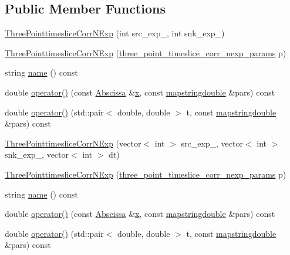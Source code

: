 \subsection*{Public Member Functions}
\begin{DoxyCompactItemize}
\item 
\mbox{\hyperlink{classThreePointtimesliceCorrNExp_ac8a35f83e9a0291cd475b9a5ae5e1845}{Three\+Pointtimeslice\+Corr\+N\+Exp}} (int src\+\_\+exp\+\_\+, int snk\+\_\+exp\+\_\+)
\item 
\mbox{\hyperlink{classThreePointtimesliceCorrNExp_ac534e7a713a02952ba092e95e77b9838}{Three\+Pointtimeslice\+Corr\+N\+Exp}} (\mbox{\hyperlink{structthree__point__timeslice__corr__nexp__params}{three\+\_\+point\+\_\+timeslice\+\_\+corr\+\_\+nexp\+\_\+params}} p)
\item 
string \mbox{\hyperlink{classThreePointtimesliceCorrNExp_aa137e909c6466275f495aac9f2d24178}{name}} () const
\item 
double \mbox{\hyperlink{classThreePointtimesliceCorrNExp_a4d3143ae44c362e4dae6221ace8f1c02}{operator()}} (const \mbox{\hyperlink{classAbscissa}{Abscissa}} \&\mbox{\hyperlink{old__edb_8cc_a63584b830e7aaacb521b11b72291a4bc}{x}}, const \mbox{\hyperlink{lib_2fitting__lib_2includes_8h_a647b481c557c7966517f753340a81d13}{mapstringdouble}} \&pars) const
\item 
double \mbox{\hyperlink{classThreePointtimesliceCorrNExp_a32c3a96362aae58e8eb5a5eb8f5aafc9}{operator()}} (std\+::pair$<$ double, double $>$ t, const \mbox{\hyperlink{lib_2fitting__lib_2includes_8h_a647b481c557c7966517f753340a81d13}{mapstringdouble}} \&pars) const
\item 
\mbox{\hyperlink{classThreePointtimesliceCorrNExp_a12f727578fcbdda46fd6e959853d5392}{Three\+Pointtimeslice\+Corr\+N\+Exp}} (vector$<$ int $>$ src\+\_\+exp\+\_\+, vector$<$ int $>$ snk\+\_\+exp\+\_\+, vector$<$ int $>$ dt)
\item 
\mbox{\hyperlink{classThreePointtimesliceCorrNExp_ac534e7a713a02952ba092e95e77b9838}{Three\+Pointtimeslice\+Corr\+N\+Exp}} (\mbox{\hyperlink{structthree__point__timeslice__corr__nexp__params}{three\+\_\+point\+\_\+timeslice\+\_\+corr\+\_\+nexp\+\_\+params}} p)
\item 
string \mbox{\hyperlink{classThreePointtimesliceCorrNExp_aa137e909c6466275f495aac9f2d24178}{name}} () const
\item 
double \mbox{\hyperlink{classThreePointtimesliceCorrNExp_a4d3143ae44c362e4dae6221ace8f1c02}{operator()}} (const \mbox{\hyperlink{classAbscissa}{Abscissa}} \&\mbox{\hyperlink{old__edb_8cc_a63584b830e7aaacb521b11b72291a4bc}{x}}, const \mbox{\hyperlink{lib_2fitting__lib_2includes_8h_a647b481c557c7966517f753340a81d13}{mapstringdouble}} \&pars) const
\item 
double \mbox{\hyperlink{classThreePointtimesliceCorrNExp_a32c3a96362aae58e8eb5a5eb8f5aafc9}{operator()}} (std\+::pair$<$ double, double $>$ t, const \mbox{\hyperlink{lib_2fitting__lib_2includes_8h_a647b481c557c7966517f753340a81d13}{mapstringdouble}} \&pars) const
\end{DoxyCompactItemize}
